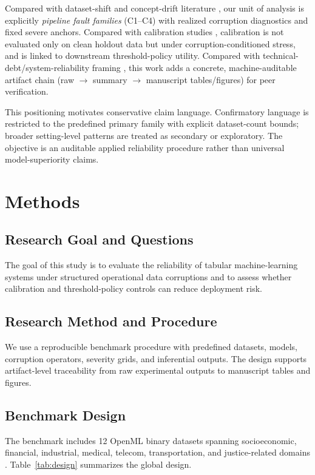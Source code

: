 \documentclass{AuthorGuide/ijitcs}
\begin{document}
Compared with dataset-shift and concept-drift literature \cite{quionero2009datasetshift,moreno2012datasetshift,gama2014conceptdrift}, our unit of analysis is explicitly \emph{pipeline fault families} (C1--C4) with realized corruption diagnostics and fixed severe anchors. Compared with calibration studies \cite{platt2000probabilities,guo2017calibration,kull2017beta}, calibration is not evaluated only on clean holdout data but under corruption-conditioned stress, and is linked to downstream threshold-policy utility. Compared with technical-debt/system-reliability framing \cite{sculley2015hidden}, this work adds a concrete, machine-auditable artifact chain (raw $\rightarrow$ summary $\rightarrow$ manuscript tables/figures) for peer verification.

This positioning motivates conservative claim language. Confirmatory language is restricted to the predefined primary family with explicit dataset-count bounds; broader setting-level patterns are treated as secondary or exploratory. The objective is an auditable applied reliability procedure rather than universal model-superiority claims.

\section{Methods}
\subsection{Research Goal and Questions}
The goal of this study is to evaluate the reliability of tabular machine-learning systems under structured operational data corruptions and to assess whether calibration and threshold-policy controls can reduce deployment risk.

\subsection{Research Method and Procedure}
We use a reproducible benchmark procedure with predefined datasets, models, corruption operators, severity grids, and inferential outputs. The design supports artifact-level traceability from raw experimental outputs to manuscript tables and figures.

\subsection{Benchmark Design}
The benchmark includes 12 OpenML binary datasets spanning socioeconomic, financial, industrial, medical, telecom, transportation, and justice-related domains \cite{vanschoren2014openml}. Table~\ref{tab:design} summarizes the global design.
\end{document}
